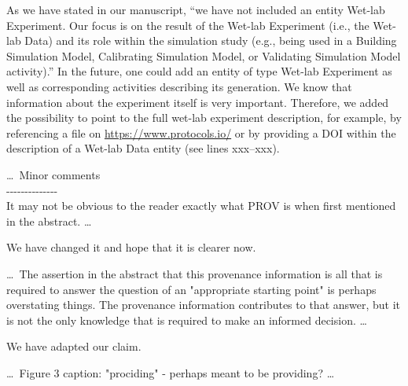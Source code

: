 \documentclass{article}
\newcommand{\WD}{Wet-lab Data}
\newcommand{\WE}{Wet-lab Experiment}
\newcommand{\BSM}{Building Simulation Model}
\newcommand{\CSM}{Calibrating Simulation Model}
\newcommand{\VSM}{Validating Simulation Model}
\begin{document}
As we have stated in our manuscript, \enquote{we have not included an entity \WE{}.
Our focus is on the result of the \WE{} (i.e., the \WD{}) and its role within the simulation study (e.g., being used in a \BSM{}, \CSM{}, or \VSM{} activity).}
In the future, one could add an entity of type \WE{} as well as corresponding activities describing its generation.
We know that information about the experiment itself is very important.
Therefore, we added the possibility to point to the full wet-lab experiment description, for example, by referencing a file on \url{https://www.protocols.io/} or by providing a DOI within the description of a \WD{} entity (see lines xxx--xxx).

\begin{mdframed}
\ldots\, Minor comments\\
-{}-{}-{}-{}-{}-{}-{}-{}-{}-{}-{}-{}-{}-\\
It may not be obvious to the reader exactly what PROV is when first mentioned in the abstract. \ldots
\end{mdframed}

We have changed it and hope that it is clearer now.

\begin{mdframed}
\ldots\, The assertion in the abstract that this provenance information is all that is required to answer the question of an "appropriate starting point" is perhaps overstating things.
The provenance information contributes to that answer, but it is not the only knowledge that is required to make an informed decision. \ldots
\end{mdframed}

We have adapted our claim.


\begin{mdframed}
\ldots\, Figure 3 caption: "prociding" - perhaps meant to be providing? \ldots
\end{mdframed}
\end{document}
